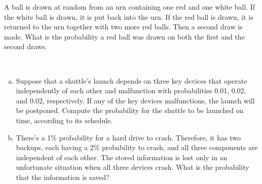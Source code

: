 \documentclass[12pt]{article}
\newenvironment{question}[2][Question]{\begin{trivlist}
\item[\hskip \labelsep {\bfseries #1}\hskip \labelsep {\bfseries #2.}]}{\end{trivlist}}
\begin{document}
\pagebreak
 \begin{question}{4} A ball is drawn at random from an urn containing one red and one white ball. If the white ball is drawn, it is put back into the urn. If the red ball is drawn, it is returned to the urn together with two more red balls. Then a second draw is made. What is the probability a red ball was drawn on both the first and the second draws.
\end{question} 


\pagebreak
 \begin{question}{5} \ 
 \begin{enumerate}[(a)]
 \item  Suppose that a shuttle's launch depends on three key devices that operate independently of each other and malfunction with probabilities 0.01, 0.02, and 0.02, respectively. If any of the key devices malfunctions, the launch will be postponed. Compute the probability for the shuttle to be launched on time, according to its schedule.
 \item There's a 1\% probability for a hard drive to crash. Therefore, it has two backups, each having a 2\% probability to crash, and all three components are independent of each other. The stored information is lost only in an unfortunate situation when all three devices crash. What is the probability that the information is saved?
 \end{enumerate}
 

\end{question} 
\end{document}
